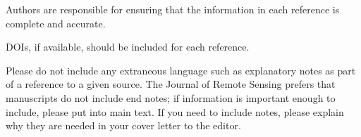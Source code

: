 \documentclass{article}
\begin{document}
Authors are responsible for ensuring that the information in each reference is complete and accurate.

DOIs, if available, should be included for each reference.

Please do not include any extraneous language such as explanatory notes as part of a reference to a given source. The Journal of Remote Sensing prefers that manuscripts do not include end notes; if information is important enough to include, please put into main text.  If you need to include notes, please explain why they are needed in your cover letter to the editor.

\printbibliography
\end{document}
